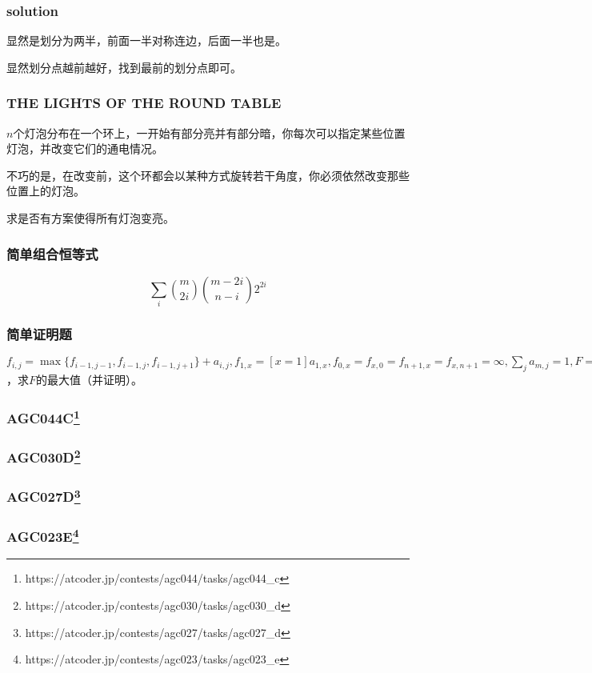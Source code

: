\documentclass[10pt]{beamer}
\begin{document}
	\clearpage
	\begin{frame}
		\frametitle{solution}
	
		显然是划分为两半，前面一半对称连边，后面一半也是。

		显然划分点越前越好，找到最前的划分点即可。
	
	\end{frame}
	\clearpage
	\begin{frame}
		\frametitle{THE LIGHTS OF THE ROUND TABLE}
	
		$n$个灯泡分布在一个环上，一开始有部分亮并有部分暗，你每次可以指定某些位置灯泡，并改变它们的通电情况。

		不巧的是，在改变前，这个环都会以某种方式旋转若干角度，你必须依然改变那些位置上的灯泡。

		求是否有方案使得所有灯泡变亮。
	
	\end{frame}
	\clearpage
	\begin{frame}
		\frametitle{简单组合恒等式}
	
		$$
		\sum_i {m\choose 2i}{m-2i\choose n-i}2^{2i}
		$$
	
	\end{frame}
	\clearpage
	\begin{frame}
		\frametitle{简单证明题}
	
		$f_{i,j}=\max\{f_{i-1,j-1},f_{i-1,j},f_{i-1,j+1}\}+a_{i,j},f_{1,x}=[x=1]a_{1,x},f_{0,x}=f_{x,0}=f_{n+1,x}=f_{x,n+1}=\infty,\sum_{j}a_{m,j}=1,F=\min_i\{f_{n,i}\}$，求$F$的最大值（并证明）。
	
	\end{frame}
	\clearpage
	\begin{frame}
		\frametitle{AGC044C\footnote{https://atcoder.jp/contests/agc044/tasks/agc044\_c}}
	
	\end{frame}
	\clearpage
	\begin{frame}
		\frametitle{AGC030D\footnote{https://atcoder.jp/contests/agc030/tasks/agc030\_d}}
	
	\end{frame}
	\clearpage
	\begin{frame}
		\frametitle{AGC027D\footnote{https://atcoder.jp/contests/agc027/tasks/agc027\_d}}
	
	\end{frame}
	\clearpage
	\begin{frame}
		\frametitle{AGC023E\footnote{https://atcoder.jp/contests/agc023/tasks/agc023\_e}}
	
	\end{frame}
\end{document}
